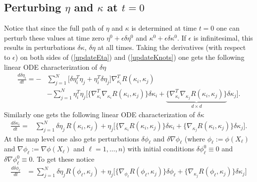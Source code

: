 \documentclass[noinfoline]{imsart}
\begin{document}
{%
\subsection{Perturbing $\eta$ and $\kappa$ at $t=0$}
Notice that since the full path of $\eta$ and $\kappa$ is determined at time $t=0$ one can perturb these values at time zero  $\eta^0+\epsilon \delta \eta^0$ and $\kappa^0+ \epsilon \delta \kappa^0$. If $\epsilon$ is infinitesimal, this results in perturbations $\delta \kappa$, $\delta \eta$ at all times. 
Taking the derivatives (with respect to $\epsilon$) on both sides of (\ref{updateEta}) and (\ref{updateKnots}) one gets the following linear ODE characterization of $\delta\eta$
\begin{align}
\frac{d\delta \eta_i}{dt} = -&\sum_{j=1}^N \bigl[ \delta\eta^T_i \eta_j +\eta^T_i \delta\eta_j    \bigr] \nabla^T_{\kappa_i}R(\kappa_i,\kappa_j) \\
&-\sum_{j=1}^N \eta^T_i \eta_j  \bigl[  \{\nabla^T_{\kappa_i}\nabla_{\kappa_i}R(\kappa_i,\kappa_j)\} \delta\kappa_i +  \underbrace{ \{\nabla^T_{\kappa_i}\nabla_{\kappa_j}R(\kappa_i,\kappa_j)\} }_{d\times d}\delta\kappa_j \bigr].
\end{align}
Similarly one gets the following linear ODE characterization of $\delta\kappa$
\begin{align}
\frac{d\delta\kappa_i}{dt}=&\sum_{j=1}^N \delta\eta_j\, R(\kappa_i,\kappa_j) + \eta_j \bigl[ \{\nabla_{\kappa_i} R(\kappa_i,\kappa_j)\} \delta\kappa_i + \{\nabla_{\kappa_j} R(\kappa_i,\kappa_j)\} \delta\kappa_j   \bigr].
\end{align}
At the map level one also gets perturbations $\delta \phi_\ell$ and $\delta \nabla\phi_\ell$ (where $\phi_\ell := \phi(X_\ell)$ and $\nabla\phi_\ell := \nabla\phi(X_\ell)$ and $\ell=1,\ldots, n$) with initial conditions $\delta \phi_\ell^0 \equiv 0$ and  $\delta \nabla \phi^0_\ell \equiv 0$. 
To get these notice
\begin{align}
\frac{d\delta\phi_\ell}{dt} &= \sum_{j=1}^N \delta\eta_j R(\phi_\ell,\kappa_j) +\eta_j\bigl[ \{\nabla_{\phi_\ell}R(\phi_\ell,\kappa_j)\} \delta\phi_\ell   +  \{\nabla_{\kappa_j}R(\phi_\ell,\kappa_j)\} \delta\kappa_j  \bigr]

\end{align}}
\end{document}
